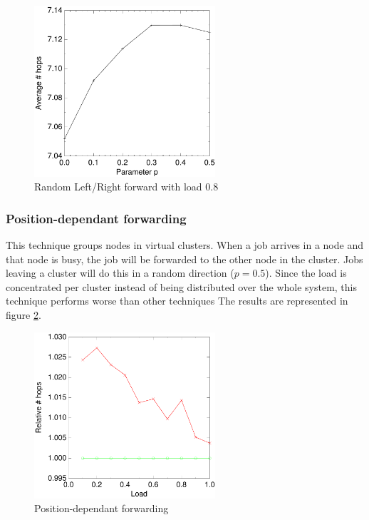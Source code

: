 \documentclass[10pt,a4paper]{article}
\begin{document}
\begin{figure}[h!tb]
\centering
\includegraphics[width=0.6\textwidth]{data/randswitchp.pdf}
\caption{Random Left/Right forward with load $0.8$}
\label{figrandswitchp}
\end{figure}

\subsubsection*{Position-dependant forwarding}
This technique groups nodes in virtual clusters. When a job arrives in a node and that node is busy, the job will be forwarded to the other node in the cluster. Jobs leaving a cluster will do this in a random direction ($p=0.5$). Since the load is concentrated per cluster instead of being distributed over the whole system, this technique performs worse than other techniques The results are represented in figure \ref{figevenswitch}.

\begin{figure}[h!tb]
\centering
\includegraphics[width=0.6\textwidth]{data/evenswitchright.pdf}
\caption{Position-dependant forwarding}
\label{figevenswitch}
\end{figure}
\end{document}
